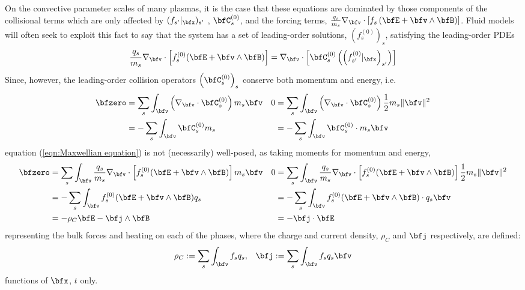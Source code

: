     On the convective parameter scales of many plasmas,  it is the case that these equations are dominated by those components of the collisional terms which are only affected by $(f_{s'}|_{\bfx})_{s'}$ , $\bfC_{s}^{(0)}$, and the forcing terms, $\frac{q_{s}}{m_{s}}\nabla_{\bfv}\cdot[f_{s}\left(\bfE + \bfv\wedge\bfB\right)]$. Fluid models will often seek to exploit this fact to say that the system has a set of leading-order solutions, $\left(f_{s}^{(0)}\right)_{s}$, satisfying the leading-order PDEs
    \begin{equation}\label{eqn:Maxwellian equation}
        \frac{q_{s}}{m_{s}}\nabla_{\bfv}\cdot\left[f_{s}^{(0)}(\bfE + \bfv\wedge\bfB)\right]  =  \nabla_{\bfv}\cdot\left[\bfC_{s}^{(0)}\left(\left(f_{s'}^{(0)}|_{\bfx}\right)_{s'}\right)\right]
    \end{equation}
    Since, however, the leading-order collision operators $\left(\bfC_{s}^{(0)}\right)_{s}$ conserve both momentum and energy, i.e.
    \begin{align*}
        \bfzero  &=  \sum_{s}\int_{\bfv}\left(\nabla_{\bfv}\cdot\bfC_{s}^{(0)}\right)m_{s}\bfv  &  0  &=  \sum_{s}\int_{\bfv}\left(\nabla_{\bfv}\cdot\bfC_{s}^{(0)}\right)\frac{1}{2}m_{s}\|\bfv\|^{2}  \\
        &=  - \sum_{s}\int_{\bfv}\bfC_{s}^{(0)}m_{s}  &  &=  - \sum_{s}\int_{\bfv}\bfC_{s}^{(0)}\cdot m_{s}\bfv
    \end{align*}
     equation (\ref{eqn:Maxwellian equation}) is not (necessarily) well-posed, as taking moments for momentum and energy,
    \begin{align*}
        \bfzero  &=  \sum_{s}\int_{\bfv}\frac{q_{s}}{m_{s}}\nabla_{\bfv}\cdot\left[f_{s}^{(0)}(\bfE + \bfv\wedge\bfB)\right]m_{s}\bfv  &  0  &=  \sum_{s}\int_{\bfv}\frac{q_{s}}{m_{s}}\nabla_{\bfv}\cdot\left[f_{s}^{(0)}(\bfE + \bfv\wedge\bfB)\right]\frac{1}{2}m_{s}\|\bfv\|^{2}  \\
        &=  - \sum_{s}\int_{\bfv}f_{s}^{(0)}(\bfE + \bfv\wedge\bfB)q_{s}  &  &=  - \sum_{s}\int_{\bfv}f_{s}^{(0)}(\bfE + \bfv\wedge\bfB)\cdot q_{s}\bfv  \\
        &=  - \rho_{C}\bfE - \bfj\wedge\bfB  &  &=  - \bfj\cdot\bfE
    \end{align*}
    representing the bulk forces and heating on each of the phases, where the charge and current density, $\rho_{C}$ and $\bfj$ respectively, are defined:
    \begin{align}
        \rho_{C}  :=  \sum_{s}\int_{\bfv}f_{s}q_{s},  &&
        \bfj      :=  \sum_{s}\int_{\bfv}f_{s}q_{s}\bfv
    \end{align}
    functions of $\bfx$, $t$ only.
    
